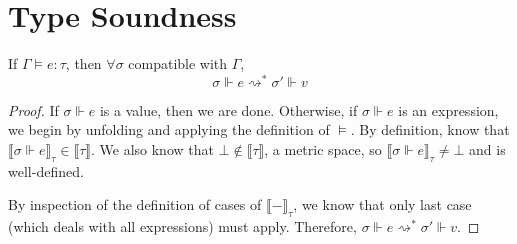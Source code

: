 \section{Type Soundness}
\begin{lemma}[Termination]
  If $\Gamma \vDash e : \tau$, then $\forall \sigma$ compatible with $\Gamma$, 
  $$\sigma \Vdash e \rightsquigarrow^* \sigma' \Vdash v$$
\end{lemma}
\begin{proof}
  If $\sigma \Vdash e$ is a value, then we are done. Otherwise, if $\sigma
  \Vdash e$ is an expression, we begin by unfolding and applying the definition
  of $\vDash$. By definition, know that $\llbracket \sigma \Vdash e \rrbracket_{\tau} \in
  \llbracket \tau \rrbracket$. We also know that $\bot \not\in \llbracket \tau
  \rrbracket$, a metric space, so $\llbracket \sigma \Vdash e \rrbracket_{\tau}
  \not= \bot$ and is well-defined.

  By inspection of the definition of cases of $\llbracket - \rrbracket_{\tau}$,
  we know that only last case (which deals with all expressions) must apply.
  Therefore, $\sigma \Vdash e \rightsquigarrow^* \sigma' \Vdash v$.
\end{proof}


